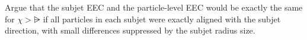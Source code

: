 

\begin{exercise}
    Argue that the subjet EEC and the particle-level EEC would be exactly the same for \(\chi > \rsub\) if all particles in each subjet were exactly aligned with the subjet direction, with small differences suppressed by the subjet radius size.
\end{exercise}



\begin{figure}
    \centering
    \hspace{9em}
\end{figure}
